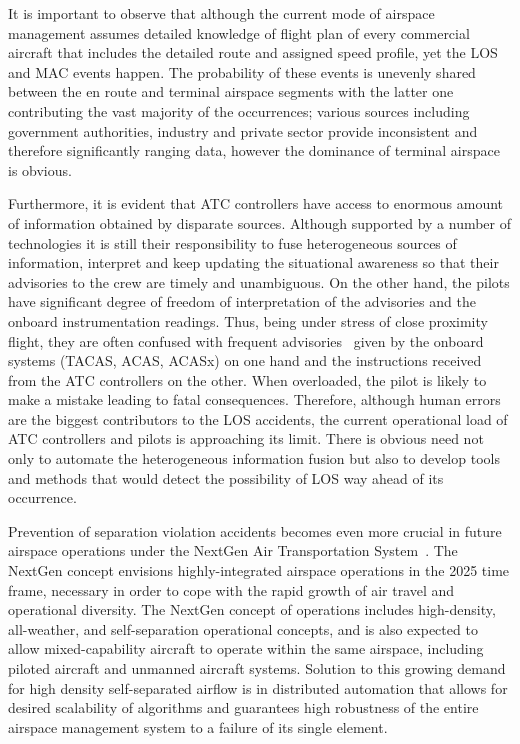 \documentclass[letter,onecolumn,12pt]{aiaa-tc}
\newcommand{\1}{1_n}
\begin{document}
It is important to observe that although the current mode of airspace management assumes detailed knowledge of flight plan of every commercial aircraft that includes the detailed route and assigned speed profile, yet the LOS and MAC events happen. The probability of these events is unevenly shared between the en route and terminal airspace segments with the latter one contributing the vast majority of the occurrences; various sources including government authorities, industry and private sector provide inconsistent and therefore significantly ranging data, however the dominance of terminal airspace is obvious.

Furthermore, it is evident that ATC controllers have access to enormous amount of information obtained by disparate sources. Although supported by a number of technologies it is still their responsibility to fuse heterogeneous sources of information, interpret and keep updating the situational awareness so that their advisories to the crew are timely and unambiguous. On the other hand, the pilots have significant degree of freedom of interpretation of the advisories and the onboard instrumentation readings. Thus, being under stress of close proximity flight, they are often confused with frequent advisories~\cite{Kochenderfer_2012} given by the onboard systems (TACAS, ACAS, ACASx) on one hand and the instructions received from the ATC controllers on the other. When overloaded, the pilot is likely to make a mistake leading to fatal consequences. Therefore, although human errors are the biggest contributors to the LOS accidents, the current operational load of ATC controllers and pilots is approaching its limit. There is obvious need not only to automate the heterogeneous information fusion but also to develop tools and methods that would detect the possibility of LOS way ahead of its occurrence.


Prevention of separation violation accidents becomes even more crucial in future airspace operations under the NextGen Air Transportation  System~\cite{NextGen_ConOps}. The NextGen concept envisions highly-integrated airspace operations in the 2025 time frame, necessary in order to cope with the rapid growth of air travel and operational diversity. The NextGen concept of operations includes high-density, all-weather, and self-separation operational concepts, and is also expected to allow mixed-capability aircraft to operate within the same airspace, including piloted aircraft and unmanned aircraft systems. Solution to this growing demand for high density self-separated airflow is in distributed automation that allows for desired scalability of algorithms and guarantees high robustness of the entire airspace management system to a failure of its single element.
\end{document}
